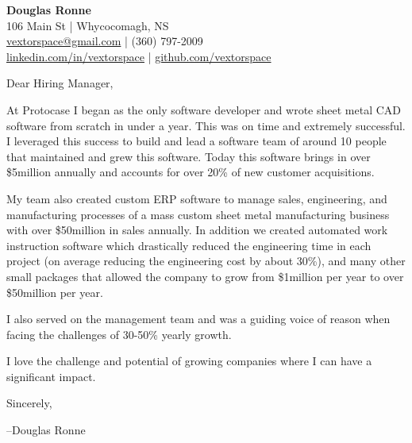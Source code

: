 \documentclass[letter,12pt]{article}
\begin{document}
\begin{center}
    {\Huge \textbf{Douglas Ronne}}\\
    \vspace{2mm}
    106 Main St | Whycocomagh, NS\\
    \href{mailto:vextorspace@gmail.com}{vextorspace@gmail.com} | (360) 797-2009\\
    \href{www.linkedin.com/in/douglas-ronne-7133272a}{linkedin.com/in/vextorspace} | \href{https://github.com/vextorspace}{github.com/vextorspace}
\end{center}

Dear Hiring Manager,

\vspace{.5cm}
\noindent
At Protocase I began as the only software developer and wrote sheet metal CAD software from scratch in under a year. This was on time and extremely successful. I leveraged this success to build and lead a software team of around 10 people that maintained and grew this software. Today this software brings in over \$5million annually and accounts for over 20\% of new customer acquisitions.

\vspace{.5cm}
\noindent
My team also created custom ERP software to manage sales, engineering, and manufacturing processes of a  mass custom sheet metal manufacturing business with over \$50million in sales annually. In addition we created automated work instruction software which drastically reduced the engineering time in each project (on average reducing the engineering cost by about 30\%), and many other small packages that allowed the company to grow from \$1million per year to over \$50million per year.

\vspace{.5cm}
\noindent
I also served on the management team and was a guiding voice of reason when facing the challenges of 30-50\% yearly growth.

\vspace{.5cm}
\noindent
I love the challenge and potential of growing companies where I can have a significant impact.

\vspace{1cm}
\noindent
Sincerely,

\noindent
--Douglas Ronne
\end{document}
